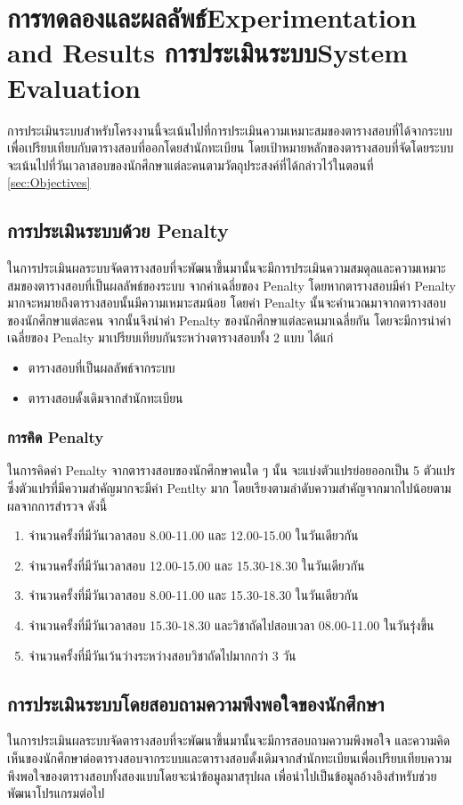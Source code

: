 \chapter{\ifproject%
\ifcpe การทดลองและผลลัพธ์\else Experimentation and Results\fi
\else%
\ifcpe การประเมินระบบ\else System Evaluation\fi
\fi}

การประเมินระบบสำหรับโครงงานนี้จะเน้นไปที่การประเมินความเหมาะสมของตารางสอบที่ได้จากระบบ
\linebreak
เพื่อเปรียบเทียบกับตารางสอบที่ออกโดยสำนักทะเบียน 
โดยเป้าหมายหลักของตารางสอบที่จัดโดยระบบจะเน้นไปที่วันเวลาสอบของนักศึกษาแต่ละคนตามวัตถุประสงค์ที่ได้กล่าวไว้ในตอนที่ \ref{sec:Objectives}

\section{การประเมินระบบด้วย Penalty}
ในการประเมินผลระบบจัดตารางสอบที่จะพัฒนาขึ้นมานั้นจะมีการประเมินความสมดุลและความเหมาะสมของตารางสอบที่เป็นผลลัพธ์ของระบบ จากค่าเฉลี่ยของ Penalty 
โดยหากตารางสอบมีค่า Penalty มากจะหมายถึงตารางสอบนั้นมีความเหมาะสมน้อย โดยค่า Penalty นั้นจะคำนวณมาจากตารางสอบของนักศึกษาแต่ละคน
จากนั้นจึงนำค่า Penalty ของนักศึกษาแต่ละคนมาเฉลี่ยกัน 
โดยจะมีการนำค่าเฉลี่ยของ Penalty มาเปรียบเทียบกันระหว่างตารางสอบทั้ง 2 แบบ
ได้แก่
\begin{itemize}
    \item ตารางสอบที่เป็นผลลัพธ์จากระบบ
    \item ตารางสอบดั้งเดิมจากสำนักทะเบียน
\end{itemize}

\subsection{การคิด Penalty}
ในการคิดค่า Penalty จากตารางสอบของนักศึกษาคนใด ๆ นั้น จะแบ่งตัวแปรย่อยออกเป็น 5 ตัวแปร 
ซึ่งตัวแปรที่มีความสำคัญมากจะมีค่า Pentlty มาก โดยเรียงตามลำดับความสำคัญจากมากไปน้อยตามผลจากการสำรวจ ดังนี้
\begin{enumerate}
    \item จำนวนครั้งที่มีวันเวลาสอบ 8.00-11.00 และ 12.00-15.00 ในวันเดียวกัน
    \item จำนวนครั้งที่มีวันเวลาสอบ 12.00-15.00 และ 15.30-18.30 ในวันเดียวกัน
    \item จำนวนครั้งที่มีวันเวลาสอบ 8.00-11.00 และ 15.30-18.30 ในวันเดียวกัน
    \item จำนวนครั้งที่มีวันเวลาสอบ 15.30-18.30 และวิชาถัดไปสอบเวลา 08.00-11.00 ในวันรุ่งขึ้น
    \item จำนวนครั้งที่มีวันเว้นว่างระหว่างสอบวิชาถัดไปมากกว่า 3 วัน
\end{enumerate}

\section{การประเมินระบบโดยสอบถามความพึงพอใจของนักศึกษา}
ในการประเมินผลระบบจัดตารางสอบที่จะพัฒนาขึ้นมานั้นจะมีการสอบถามความพึงพอใจ
และความคิดเห็นของนักศึกษาต่อตารางสอบจากระบบและตารางสอบดั้งเดิมจากสำนักทะเบียนเพื่อเปรียบเทียบความพึงพอใจของตารางสอบทั้งสองแบบโดยจะนำข้อมูลมาสรุปผล เพื่อนำไปเป็นข้อมูลอ้างอิงสำหรับช่วย
พัฒนาโปรแกรมต่อไป